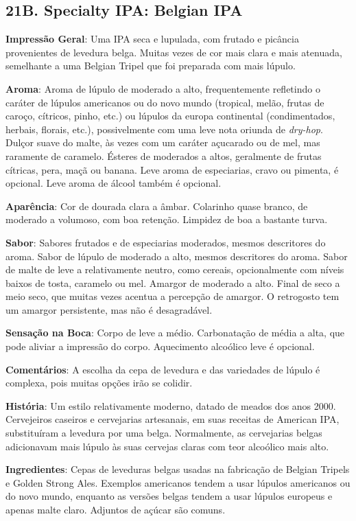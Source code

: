 \subsection*{21B. Specialty IPA: Belgian IPA}
\textbf{Impressão Geral}: Uma IPA seca e lupulada, com frutado e picância provenientes de levedura belga. Muitas vezes de cor mais clara e mais atenuada, semelhante a uma Belgian Tripel que foi preparada com mais lúpulo.

\textbf{Aroma}: Aroma de lúpulo de moderado a alto, frequentemente refletindo o caráter de lúpulos americanos ou do novo mundo (tropical, melão, frutas de caroço, cítricos, pinho, etc.) ou lúpulos da europa continental (condimentados, herbais, florais, etc.), possivelmente com uma leve nota oriunda de \textit{dry-hop}. Dulçor suave do malte, às vezes com um caráter açucarado ou de mel, mas raramente de caramelo. Ésteres de moderados a altos, geralmente de frutas cítricas, pera, maçã ou banana. Leve aroma de especiarias, cravo ou pimenta, é opcional. Leve aroma de álcool também é opcional.

\textbf{Aparência}: Cor de dourada clara a âmbar. Colarinho quase branco, de moderado a volumoso, com boa retenção. Limpidez de boa a bastante turva.

\textbf{Sabor}: Sabores frutados e de especiarias moderados, mesmos descritores do aroma. Sabor de lúpulo de moderado a alto, mesmos descritores do aroma. Sabor de malte de leve a relativamente neutro, como cereais, opcionalmente com níveis baixos de tosta, caramelo ou mel. Amargor de moderado a alto. Final de seco a meio seco, que muitas vezes acentua a percepção de amargor. O retrogosto tem um amargor persistente, mas não é desagradável.

\textbf{Sensação na Boca}: Corpo de leve a médio. Carbonatação de média a alta, que pode aliviar a impressão do corpo. Aquecimento alcoólico leve é opcional.

\textbf{Comentários}: A escolha da cepa de levedura e das variedades de lúpulo é complexa, pois muitas opções irão se colidir.

\textbf{História}: Um estilo relativamente moderno, datado de meados dos anos 2000. Cervejeiros caseiros e cervejarias artesanais, em suas receitas de American IPA, substituíram a levedura por uma belga. Normalmente, as cervejarias belgas adicionavam mais lúpulo às suas cervejas claras com teor alcoólico mais alto.

\textbf{Ingredientes}: Cepas de leveduras belgas usadas na fabricação de Belgian Tripels e Golden Strong Ales. Exemplos americanos tendem a usar lúpulos americanos ou do novo mundo, enquanto as versões belgas tendem a usar lúpulos europeus e apenas malte claro. Adjuntos de açúcar são comuns.

